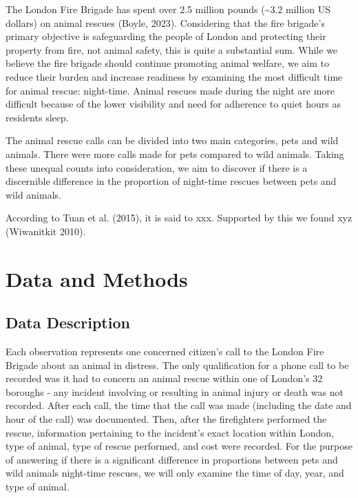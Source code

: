 \documentclass[
]{article}
\begin{document}
The London Fire Brigade has spent over 2.5 million pounds
(\textasciitilde3.2 million US dollars) on animal rescues (Boyle, 2023).
Considering that the fire brigade's primary objective is safeguarding
the people of London and protecting their property from fire, not animal
safety, this is quite a substantial sum. While we believe the fire
brigade should continue promoting animal welfare, we aim to reduce their
burden and increase readiness by examining the most difficult time for
animal rescue: night-time. Animal rescues made during the night are more
difficult because of the lower visibility and need for adherence to
quiet hours as residents sleep.

The animal rescue calls can be divided into two main categories, pets
and wild animals. There were more calls made for pets compared to wild
animals. Taking these unequal counts into consideration, we aim to
discover if there is a discernible difference in the proportion of
night-time rescues between pets and wild animals.

According to Tuan et al. (2015), it is said to xxx. Supported by this we
found xyz (Wiwanitkit 2010).

\hypertarget{data-and-methods}{%
\section{Data and Methods}\label{data-and-methods}}

\hypertarget{data-description}{%
\subsection{Data Description}\label{data-description}}

Each observation represents one concerned citizen's call to the London
Fire Brigade about an animal in distress. The only qualification for a
phone call to be recorded was it had to concern an animal rescue within
one of London's 32 boroughs - any incident involving or resulting in
animal injury or death was not recorded. After each call, the time that
the call was made (including the date and hour of the call) was
documented. Then, after the firefighters performed the rescue,
information pertaining to the incident's exact location within London,
type of animal, type of rescue performed, and cost were recorded. For
the purpose of answering if there is a significant difference in
proportions between pets and wild animals night-time rescues, we will
only examine the time of day, year, and type of animal.
\end{document}

